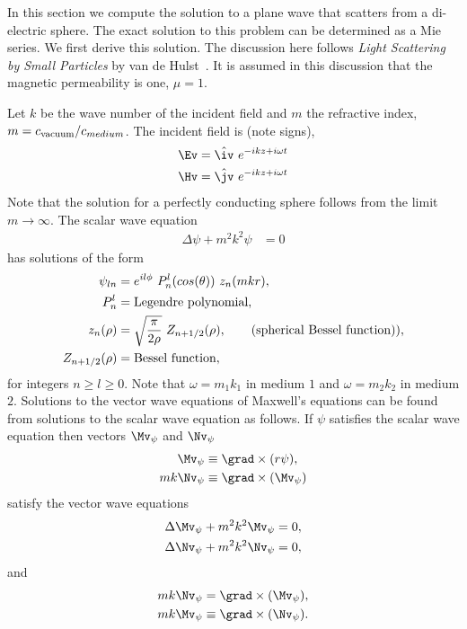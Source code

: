 
In this section we compute the solution to a plane wave that scatters from a di-electric sphere.
% 
The exact solution to this problem can be determined as a Mie series. We first derive this solution. 
The discussion here follows {\em Light Scattering by Small Particles} by van de Hulst~\cite{vanDeHulst57}. 
It is assumed in this discussion that the magnetic permeability is one, $\mu=1$. 

Let $k$ be the wave number of the incident field and $m$ the refractive index, $m=c_{\rm vacuum}/c_{medium}$.
The incident field is (note signs), 
\begin{align*}
  \Ev = \hat{\iv}~ e^{-i k z+i\omega t} \\
  \Hv = \hat{\jv}~ e^{-i k z+i\omega t} 
\end{align*}
Note that the solution for a perfectly conducting sphere follows from the limit $m\rightarrow \infty$.
% 
The scalar wave equation
\begin{align*}
  \Delta \psi + m^2 k^2  \psi &=0 
\end{align*}
has solutions of the form
\begin{align*}
  \psi_{ln} &= e^{i l \phi}~ P_n^l(cos(\theta))~z_n(m k r) , \\
  P_n^l &= \text{Legendre polynomial}, \\
  z_n(\rho) &= \sqrt{ \pi\over 2\rho}~Z_{n+1/2}(\rho), \qquad (\text{spherical Bessel function)}), \\
  Z_{n+1/2}(\rho) &= \text{Bessel function}, 
\end{align*}
for integers $n\ge l\ge 0$. Note that $\omega=m_1 k_1$ in medium $1$ and $\omega=m_2 k_2$ in medium $2$.
% 
Solutions to the vector wave equations of Maxwell's equations can be found from solutions to the scalar
wave equation as follows.
If $\psi$ satisfies the scalar wave equation then vectors $\Mv_\psi$ and $\Nv_\psi$
\begin{align*}
  \Mv_\psi &\equiv \grad\times(r\psi), \\
  m k  \Nv_\psi &\equiv \grad\times(\Mv_\psi)
\end{align*}
satisfy the vector wave equations
\begin{align*}
  \Delta \Mv_\psi + m^2 k^2 \Mv_\psi &=0, \\
  \Delta \Nv_\psi + m^2 k^2 \Nv_\psi &=0,
\end{align*}
and
\begin{align*}
  m k \Nv_\psi &= \grad\times(\Mv_\psi), \\
  m k  \Mv_\psi &\equiv \grad\times(\Nv_\psi) .
\end{align*}
